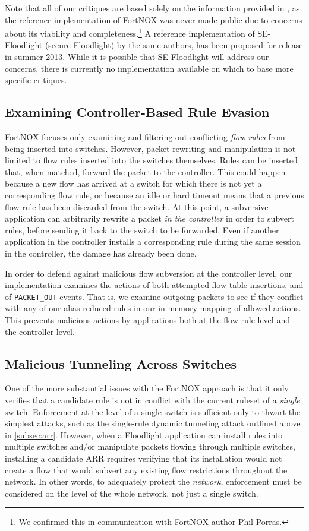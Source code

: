 Note that all of our critiques are based solely on the information provided in \cite{Porras:2012:SEK:2342441.2342466}, as the reference implementation of FortNOX was never made public due to concerns about its viability and completeness.\footnote{We confirmed this in communication with FortNOX author Phil Porras.} A reference implementation of SE-Floodlight (secure Floodlight) by the same authors, has been proposed for release in summer 2013. While it is possible that SE-Floodlight will address our concerns, there is currently no implementation available on which to base more specific critiques.

\subsection{Examining Controller-Based Rule Evasion}
FortNOX focuses only examining and filtering out conflicting \emph{flow rules} from being inserted into switches. However, packet rewriting and manipulation is not limited to flow rules inserted into the switches themselves. Rules can be inserted that, when matched, forward the packet to the controller. This could happen because a new flow has arrived at a switch for which there is not yet a corresponding flow rule, or because an idle or hard timeout means that a previous flow rule has been discarded from the switch. At this point, a subversive application can arbitrarily rewrite a packet \emph{in the controller} in order to subvert rules, before sending it back to the switch to be forwarded. Even if another application in the controller installs a corresponding rule during the same session in the controller, the damage has already been done. 

In order to defend against malicious flow subversion at the controller level, our implementation examines the actions of both attempted flow-table insertions, and of \texttt{PACKET\_OUT} events. That is, we examine outgoing packets to see if they conflict with any of our alias reduced rules in our in-memory mapping of allowed actions. This prevents malicious actions by applications both at the flow-rule level and the controller level.

\subsection{Malicious Tunneling Across Switches}
One of the more substantial issues with the FortNOX approach is that it only verifies that a candidate rule is not in conflict with the current ruleset of a \emph{single} switch. Enforcement at the level of a single switch is sufficient only to thwart the simplest attacks, such as the single-rule dynamic tunneling attack outlined above in \ref{subsec:arr}. However, when a Floodlight application can install rules into multiple switches and/or manipulate packets flowing through multiple switches, installing a candidate ARR requires verifying that its installation would not create a flow that would subvert any existing flow restrictions throughout the network. In other words, to adequately protect the \emph{network}, enforcement must be considered on the level of the whole network, not just a single switch.

